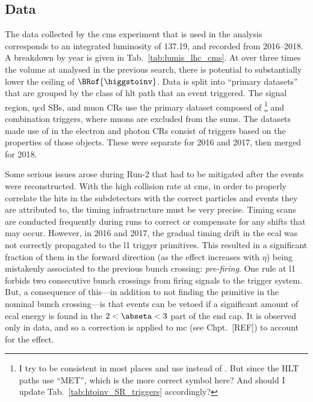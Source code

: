 

\subsection{Data}
\label{subsec:htoinv_data}

The data collected by the \acrshort{cms} experiment that is used in the analysis corresponds to an integrated luminosity of 137.19\fbinv, and recorded from 2016--2018. A breakdown by year is given in Tab.~\ref{tab:lumis_lhc_cms}. At over three times the volume at \comruntwo analysed in the previous search, there is potential to substantially lower the ceiling of $\BRof{\higgstoinv}$. Data is split into ``primary datasets'' that are grouped by the class of \acrshort{hlt} path that an event triggered. The signal region, \acrshort{qcd} \glspl{SB}, and muon \glspl{CR} use the primary dataset composed of \etmiss\footnote{I try to be consistent in most places and use \ptmiss instead of \etmiss. But since the HLT paths use ``MET'', which is the more correct symbol here? And should I update Tab.~\ref{tab:htoinv_SR_triggers} accordingly?} and \htmiss combination triggers, where muons are excluded from the sums. The datasets made use of in the electron and photon \glspl{CR} consist of triggers based on the properties of those objects. These were separate for 2016 and 2017, then merged for 2018.

Some serious issues arose during Run-2 that had to be mitigated after the events were reconstructed. With the high collision rate at \acrshort{cms}, in order to properly correlate the hits in the subdetectors with the correct particles and events they are attributed to, the timing infrastructure must be very precise. Timing scans are conducted frequently during runs to correct or compensate for any shifts that may occur. However, in 2016 and 2017, the gradual timing drift in the \acrshort{ecal} was not correctly propagated to the \acrlong{l1} trigger primitives. This resulted in a significant fraction of them in the forward direction (as the effect increases with $\eta$) being mistakenly associated to the previous bunch crossing: \emph{pre-firing}. One rule at \acrlong{l1} forbids two consecutive bunch crossings from firing signals to the trigger system. But, a consequence of this---in addition to not finding the primitive in the nominal bunch crossing---is that events can be vetoed if a significant amount of \acrshort{ecal} energy is found in the $\text{2} < \abseta < \text{3}$ part of the end cap. It is observed only in data, and so a correction is applied to \acrshort{mc} (see Chpt.~[REF]) to account for the effect.

